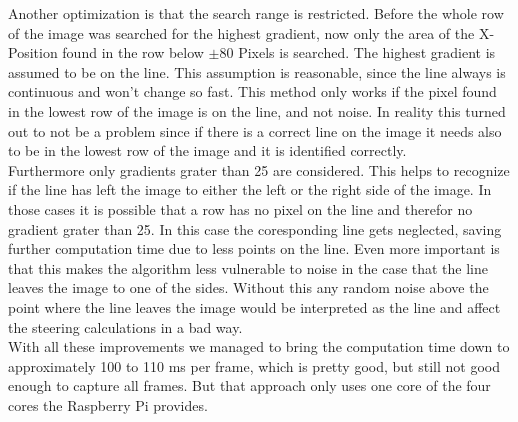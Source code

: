 \documentclass[11pt,twocolumn]{article}
\begin{document}
Another optimization is that the search range is restricted. Before the whole row of the image was searched for the highest gradient, now only the area of the X-Position found in the row below $\pm80$ Pixels is searched. The highest gradient is assumed to be on the line. This assumption is reasonable, since the line always is continuous and won't change so fast. This method only works if the pixel found in the lowest row of the image is on the line, and not noise. In reality this turned out to not be a problem since if there is a correct line on the image it needs also to be in the lowest row of the image and it is identified correctly.\\
Furthermore only gradients grater than 25 are considered. This helps to recognize if the line has left the image to either the left or the right side of the image. In those cases it is possible that a row has no pixel on the line and therefor no gradient grater than 25. In this case the coresponding line gets neglected, saving further computation time due to less points on the line. Even more important is that this makes the algorithm less vulnerable to noise in the case that the line leaves the image to one of the sides. Without this any random noise above the point where the line leaves the image would be interpreted as the line and affect the steering calculations in a bad way.\\
With all these improvements we managed to bring the computation time down to approximately 100 to 110 ms per frame, which is pretty good, but still not good enough to capture all frames. But that approach only uses one core of the four cores the Raspberry Pi provides.
\end{document}
